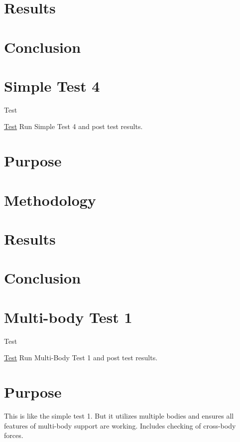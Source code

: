 \section*{Results}

\section*{Conclusion}\hypertarget{SimpleTest4}{}\section{Simple Test 4}\label{SimpleTest4}
\begin{DoxyRefDesc}{Test}
\item[\hyperlink{test__test000008}{Test}]Run Simple Test 4 and post test results.\end{DoxyRefDesc}


\section*{Purpose}

\section*{Methodology}

\section*{Results}

\section*{Conclusion}\hypertarget{MultiBodyTest1}{}\section{Multi-\/body Test 1}\label{MultiBodyTest1}
\begin{DoxyRefDesc}{Test}
\item[\hyperlink{test__test000001}{Test}]Run Multi-\/\-Body Test 1 and post test results.\end{DoxyRefDesc}


\section*{Purpose}

This is like the simple test 1. But it utilizes multiple bodies and ensures all features of multi-\/body support are working. Includes checking of cross-\/body forces.

